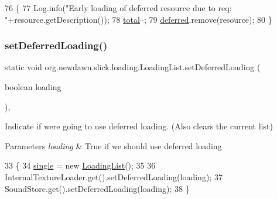 \begin{DoxyCode}
76                                                   \{
77         Log.info(\textcolor{stringliteral}{"Early loading of deferred resource due to req: "}+resource.getDescription());
78         \mbox{\hyperlink{classorg_1_1newdawn_1_1slick_1_1loading_1_1_loading_list_a26a2808de2c1171ed883cc89831b0332}{total}}--;
79         \mbox{\hyperlink{classorg_1_1newdawn_1_1slick_1_1loading_1_1_loading_list_a5ec264187931448fbcf900ccf59bab72}{deferred}}.remove(resource);
80     \}
\end{DoxyCode}
\mbox{\label{classorg_1_1newdawn_1_1slick_1_1loading_1_1_loading_list_a9a281f8df719d3727533fb55ae9b4234}} 
\subsubsection{\texorpdfstring{set\+Deferred\+Loading()}{setDeferredLoading()}}
{\footnotesize\ttfamily static void org.\+newdawn.\+slick.\+loading.\+Loading\+List.\+set\+Deferred\+Loading (\begin{DoxyParamCaption}\item[{boolean}]{loading }\end{DoxyParamCaption})\hspace{0.3cm}{\ttfamily [inline]}, {\ttfamily [static]}}

Indicate if we\textquotesingle{}re going to use deferred loading. (Also clears the current list)


\begin{DoxyParams}{Parameters}
{\em loading} & True if we should use deferred loading \\
\hline
\end{DoxyParams}

\begin{DoxyCode}
33                                                            \{
34         \mbox{\hyperlink{classorg_1_1newdawn_1_1slick_1_1loading_1_1_loading_list_ae4a959a966e43388d21307e80e2ae329}{single}} = \textcolor{keyword}{new} \mbox{\hyperlink{classorg_1_1newdawn_1_1slick_1_1loading_1_1_loading_list_ae5e62f48158e42b7488b25eb2f8de27a}{LoadingList}}();
35         
36         InternalTextureLoader.get().setDeferredLoading(loading);
37         SoundStore.get().setDeferredLoading(loading);
38     \}
\end{DoxyCode}


